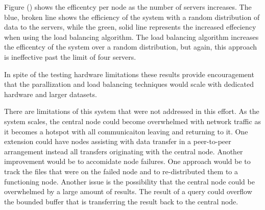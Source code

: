 \documentclass{article}
\begin{document}
\begin{multicols}{2}
Figure () shows the efficentcy per node as the number of servers increases.  The blue, broken line shows the efficiency of the system with a random distribution of data to the servers, while the green, solid line represents the increased effeciency when using the load balancing algorithm.  The load balancing algorithm increases the efficentcy of the system over a random distribution, but again, this approach is ineffective past the limit of four servers.

\noindent{}


In spite of the testing hardware limitations these results provide encouragement that the parallization and load balancing techniques would scale with dedicated hardware and larger datasets.



There are limitations of this system that were not addressed in this effort.  As the system scales, the central node could become overwhelmed with network traffic as it becomes a hotspot with all communicaiton leaving and returning to it. One extension could have nodes assisting with data transfer in a peer-to-peer arrangement instead all transfers originating with the central node.  Another improvement would be to accomidate node failures. One approach would be to track the files that were on the failed node and to re-distributed them to a functioning node.  Another issue is the possibility that the central node could be overwhelmed by a large amount of results. The result of a query could overflow the bounded buffer that is transferring the result back to the central node.   



\end{multicols}
\end{document}
